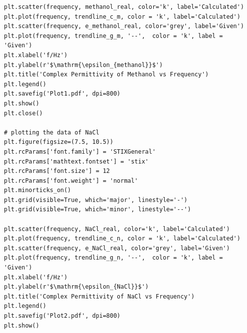 \documentclass[12pt, a4paper]{article}
\begin{document}
\begin{verbatim}
plt.scatter(frequency, methanol_real, color='k', label='Calculated')
plt.plot(frequency, trendline_c_m, color = 'k', label='Calculated')
plt.scatter(frequency, e_methanol_real, color='grey', label='Given')
plt.plot(frequency, trendline_g_m, '--',  color = 'k', label = 'Given')
plt.xlabel('f/Hz')
plt.ylabel(r'$\mathrm{\epsilon_{methanol}}$')
plt.title('Complex Permittivity of Methanol vs Frequency')
plt.legend()
plt.savefig('Plot1.pdf', dpi=800)
plt.show()
plt.close()

# plotting the data of NaCl
plt.figure(figsize=(7.5, 10.5))
plt.rcParams['font.family'] = 'STIXGeneral'
plt.rcParams['mathtext.fontset'] = 'stix'
plt.rcParams['font.size'] = 12
plt.rcParams['font.weight'] = 'normal'
plt.minorticks_on()
plt.grid(visible=True, which='major', linestyle='-')
plt.grid(visible=True, which='minor', linestyle='--')

plt.scatter(frequency, NaCl_real, color='k', label='Calculated')
plt.plot(frequency, trendline_c_n, color = 'k', label='Calculated')
plt.scatter(frequency, e_NaCl_real, color='grey', label='Given')
plt.plot(frequency, trendline_g_n, '--',  color = 'k', label = 'Given')
plt.xlabel('f/Hz')
plt.ylabel(r'$\mathrm{\epsilon_{NaCl}}$')
plt.title('Complex Permittivity of NaCl vs Frequency')
plt.legend()
plt.savefig('Plot2.pdf', dpi=800)
plt.show()

\end{verbatim}
\end{document}
